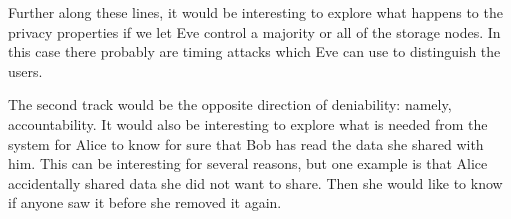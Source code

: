 Further along these lines, it would be interesting to explore what happens to 
the privacy properties if we let Eve control a majority or all of the storage 
nodes.
In this case there probably are timing attacks which Eve can use to distinguish 
the users.

The second track would be the opposite direction of deniability: namely, 
accountability.
It would also be interesting to explore what is needed from the system for 
Alice to know for sure that Bob has read the data she shared with him.
This can be interesting for several reasons, but one example is that Alice 
accidentally shared data she did not want to share.
Then she would like to know if anyone saw it before she removed it again.





\begin{frame}
\printbibliography{}
\end{frame}
